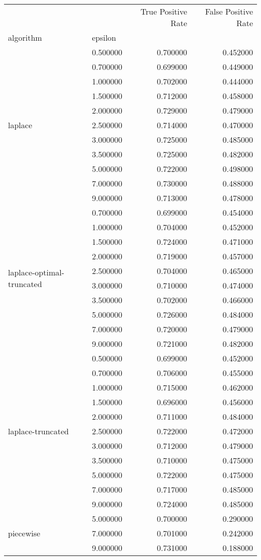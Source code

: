 \begin{tabular}{llrr}
\toprule
 &  & True Positive Rate & False Positive Rate \\
algorithm & epsilon &  &  \\
\midrule
\multirow[t]{11}{*}{laplace} & 0.500000 & 0.700000 & 0.452000 \\
 & 0.700000 & 0.699000 & 0.449000 \\
 & 1.000000 & 0.702000 & 0.444000 \\
 & 1.500000 & 0.712000 & 0.458000 \\
 & 2.000000 & 0.729000 & 0.479000 \\
 & 2.500000 & 0.714000 & 0.470000 \\
 & 3.000000 & 0.725000 & 0.485000 \\
 & 3.500000 & 0.725000 & 0.482000 \\
 & 5.000000 & 0.722000 & 0.498000 \\
 & 7.000000 & 0.730000 & 0.488000 \\
 & 9.000000 & 0.713000 & 0.478000 \\
\cline{1-4}
\multirow[t]{10}{*}{laplace-optimal-truncated} & 0.700000 & 0.699000 & 0.454000 \\
 & 1.000000 & 0.704000 & 0.452000 \\
 & 1.500000 & 0.724000 & 0.471000 \\
 & 2.000000 & 0.719000 & 0.457000 \\
 & 2.500000 & 0.704000 & 0.465000 \\
 & 3.000000 & 0.710000 & 0.474000 \\
 & 3.500000 & 0.702000 & 0.466000 \\
 & 5.000000 & 0.726000 & 0.484000 \\
 & 7.000000 & 0.720000 & 0.479000 \\
 & 9.000000 & 0.721000 & 0.482000 \\
\cline{1-4}
\multirow[t]{11}{*}{laplace-truncated} & 0.500000 & 0.699000 & 0.452000 \\
 & 0.700000 & 0.706000 & 0.455000 \\
 & 1.000000 & 0.715000 & 0.462000 \\
 & 1.500000 & 0.696000 & 0.456000 \\
 & 2.000000 & 0.711000 & 0.484000 \\
 & 2.500000 & 0.722000 & 0.472000 \\
 & 3.000000 & 0.712000 & 0.479000 \\
 & 3.500000 & 0.710000 & 0.475000 \\
 & 5.000000 & 0.722000 & 0.475000 \\
 & 7.000000 & 0.717000 & 0.485000 \\
 & 9.000000 & 0.724000 & 0.485000 \\
\cline{1-4}
\multirow[t]{3}{*}{piecewise} & 5.000000 & 0.700000 & 0.290000 \\
 & 7.000000 & 0.701000 & 0.242000 \\
 & 9.000000 & 0.731000 & 0.188000 \\
\cline{1-4}
\bottomrule
\end{tabular}
